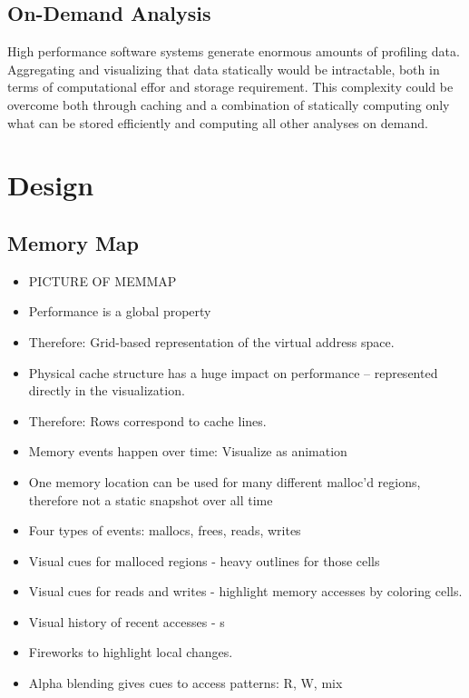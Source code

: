 \documentclass[annual]{acmsiggraph}
\begin{document}
  \subsection{On-Demand Analysis}
   
  High performance software systems generate enormous amounts of profiling data.
  Aggregating and visualizing that data statically would be intractable, 
    both in terms of computational effor and storage requirement.
  This complexity could be overcome both through caching and a combination of statically computing only what can
    be stored efficiently and computing all other analyses on demand.

\section {Design}
  \subsection{Memory Map}
    \begin{itemize}
      \item PICTURE OF MEMMAP
      \item Performance is a global property 
      \item Therefore: Grid-based representation of the virtual address space.
      \item Physical cache structure has a huge impact on performance -- represented directly in the visualization.    
      \item Therefore: Rows correspond to cache lines.
      \item Memory events happen over time: Visualize as animation
      \item One memory location can be used for many different malloc'd regions, therefore not a static snapshot over all time
      \item Four types of events: mallocs, frees, reads, writes
      \item Visual cues for malloced regions - heavy outlines for those cells
      \item Visual cues for reads and writes - highlight memory accesses by coloring cells.
      \item Visual history of recent accesses - s
      \item Fireworks to highlight local changes.
      \item Alpha blending gives cues to access patterns: R, W, mix
   \end{itemize}
\end{document}
